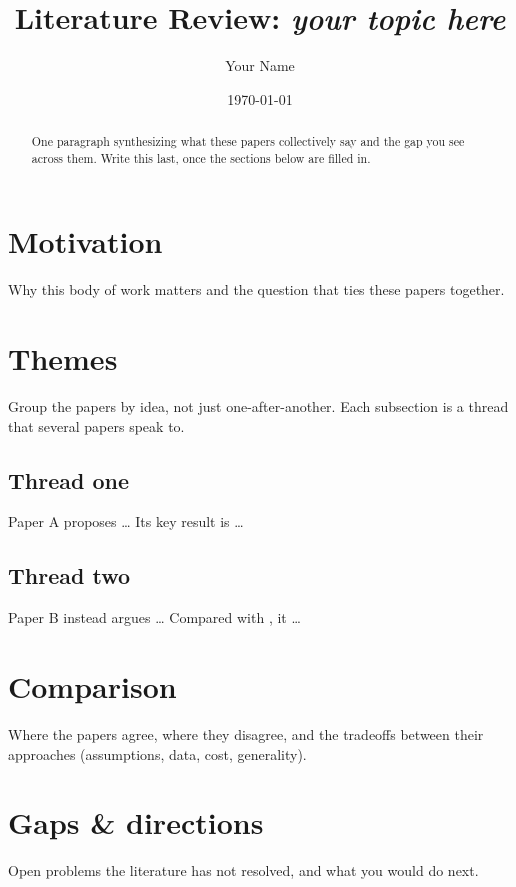\documentclass[11pt]{article}
\title{Literature Review: \emph{your topic here}}
\author{Your Name}
\date{\today}
\theoremstyle{plain}
\theoremstyle{definition}
\begin{document}
\maketitle

\begin{abstract}
One paragraph synthesizing what these papers collectively say and the gap you
see across them. Write this last, once the sections below are filled in.
\end{abstract}

\section{Motivation}
Why this body of work matters and the question that ties these papers together.

\section{Themes}
Group the papers by idea, not just one-after-another. Each subsection is a
thread that several papers speak to.

\subsection{Thread one}
Paper A \citep{keyA} proposes \dots{} Its key result is \dots{}

\subsection{Thread two}
Paper B \citep{keyB} instead argues \dots{} Compared with \citet{keyA}, it \dots{}

\section{Comparison}
Where the papers agree, where they disagree, and the tradeoffs between their
approaches (assumptions, data, cost, generality).

\section{Gaps \& directions}
Open problems the literature has not resolved, and what you would do next.



\end{document}
